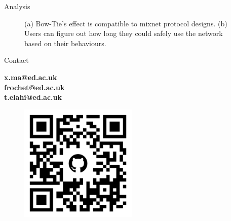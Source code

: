 \documentclass[final]{beamer}
\newlength{\rightcolwidth}
\begin{document}
\begin{frame}[t]
\begin{columns}[t]
\begin{column}{\rightcolwidth}
\begin{block}{Analysis}
\begin{figure}[t!]
    \centering
    \caption{(a) Bow-Tie's effect is compatible to mixnet protocol designs. (b) Users can figure out how long they could safely use the network based on their behaviours.}
    \label{fig:placement}
\end{figure}
\end{block}

\vspace{-1cm}
  \begin{block}{Contact}
  \begin{minipage}[t]{0.2\rightcolwidth}
  \end{minipage}
  \hfill
  \begin{minipage}[t]{0.3\rightcolwidth}
 \centering
    \textbf{x.ma@ed.ac.uk}\\
    \textbf{frochet@ed.ac.uk}\\
    \textbf{t.elahi@ed.ac.uk}
  \end{minipage}
  \hfil
  \begin{minipage}[t]{0.3\rightcolwidth}
  \vspace{-1cm}
  \begin{figure}
  \includegraphics[width=0.5\textwidth]{images/artifact.png}
  \end{figure}
  \end{minipage}
  \hfill
  \begin{minipage}[t]{0.2\rightcolwidth}
  \end{minipage}
  \end{block}
  

\end{column}
\end{columns}
\end{frame}
\end{document}
